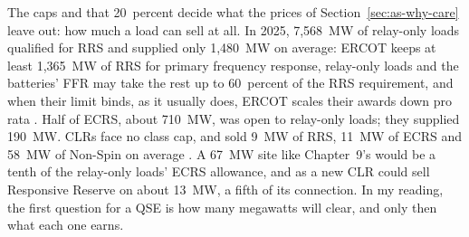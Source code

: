 The caps and that 20~percent decide what the prices of Section~\ref{sec:as-why-care} leave out: how much a load can sell at all. In 2025, 7,568~MW of relay-only loads qualified for RRS and supplied only 1,480~MW on average: ERCOT keeps at least 1,365~MW of RRS for primary frequency response, relay-only loads and the batteries' FFR may take the rest up to 60~percent of the RRS requirement, and when their limit binds, as it usually does, ERCOT scales their awards down pro rata \autocite{ercot2026protocols,ercotasmeth2025,potomac2026somercot}. %
Half of ECRS, about 710~MW, was open to relay-only loads; they supplied 190~MW. CLRs face no class cap, and sold 9~MW of RRS, 11~MW of ECRS and 58~MW of Non-Spin on average \autocite{ercot2026protocols,potomac2026somercot}. %
A 67~MW site like Chapter~9's would be a tenth of the relay-only loads' ECRS allowance, and as a new CLR could sell Responsive Reserve on about 13~MW, a fifth of its connection. %
In my reading, the first question for a QSE is how many megawatts will clear, and only then what each one earns.

